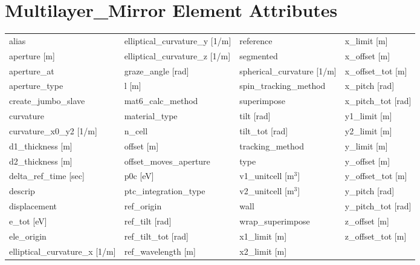  \section{Multilayer_Mirror Element Attributes}
 \label{s:list.multilayer.mirror}
 
 \begin{tabular}{llll} \toprule
alias                            & elliptical_curvature_y [1/m]     & reference                        & x_limit [m]                      \\
aperture [m]                     & elliptical_curvature_z [1/m]     & segmented                        & x_offset [m]                     \\
aperture_at                      & graze_angle [rad]                & spherical_curvature [1/m]        & x_offset_tot [m]                 \\
aperture_type                    & l [m]                            & spin_tracking_method             & x_pitch [rad]                    \\
create_jumbo_slave               & mat6_calc_method                 & superimpose                      & x_pitch_tot [rad]                \\
curvature                        & material_type                    & tilt [rad]                       & y1_limit [m]                     \\
curvature_x0_y2 [1/m]            & n_cell                           & tilt_tot [rad]                   & y2_limit [m]                     \\
d1_thickness [m]                 & offset [m]                       & tracking_method                  & y_limit [m]                      \\
d2_thickness [m]                 & offset_moves_aperture            & type                             & y_offset [m]                     \\
delta_ref_time [sec]             & p0c [eV]                         & v1_unitcell [m$^3$]              & y_offset_tot [m]                 \\
descrip                          & ptc_integration_type             & v2_unitcell [m$^3$]              & y_pitch [rad]                    \\
displacement                     & ref_origin                       & wall                             & y_pitch_tot [rad]                \\
e_tot [eV]                       & ref_tilt [rad]                   & wrap_superimpose                 & z_offset [m]                     \\
ele_origin                       & ref_tilt_tot [rad]               & x1_limit [m]                     & z_offset_tot [m]                 \\
elliptical_curvature_x [1/m]     & ref_wavelength [m]               & x2_limit [m]                     &                                  \\
 \bottomrule
 \end{tabular}
 \vfill
 

